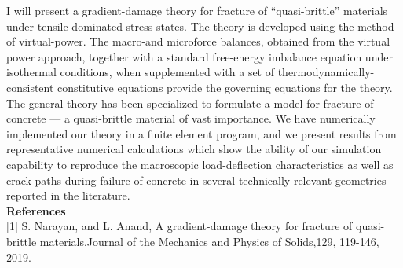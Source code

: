 I will present a gradient-damage theory for fracture of “quasi-brittle” materials under tensile dominated stress states. The theory is developed using the method of virtual-power. The macro-and microforce balances, obtained from the virtual power approach, together with a standard free-energy imbalance equation under isothermal conditions, when supplemented with a set of thermodynamically-consistent constitutive equations provide the governing equations for the theory. The general theory has been specialized to formulate a model for fracture of concrete --- a quasi-brittle material of vast importance. We have numerically implemented our theory in a finite element program, and we present results from representative numerical calculations which show the ability of our simulation capability to reproduce the macroscopic load-deflection characteristics as well as crack-paths during failure of concrete in several technically relevant geometries reported in the literature.\\

\noindent\textbf{References}\\
$[$1$]$ S. Narayan, and L. Anand, A gradient-damage theory for fracture of quasi-brittle materials,Journal of the Mechanics and Physics of Solids,129, 119-146, 2019.
